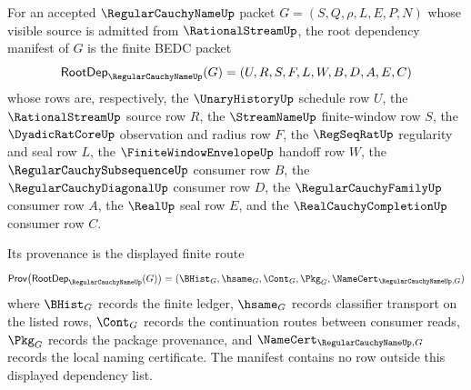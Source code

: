 \begin{definition}
\label{def:regularcauchyname-root-dependency-manifest}
For an accepted $\RegularCauchyNameUp$ packet $G=(S,Q,\rho,L,E,P,N)$ whose visible source is admitted from $\RationalStreamUp$, the root dependency manifest of $G$ is the finite BEDC packet
$$
\mathsf{RootDep}_{\RegularCauchyNameUp}(G)
=
(U,R,S,F,L,W,B,D,A,E,C)
$$
whose rows are, respectively, the $\UnaryHistoryUp$ schedule row $U$, the $\RationalStreamUp$ source row $R$, the $\StreamNameUp$ finite-window row $S$, the $\DyadicRatCoreUp$ observation and radius row $F$, the $\RegSeqRatUp$ regularity and seal row $L$, the $\FiniteWindowEnvelopeUp$ handoff row $W$, the $\RegularCauchySubsequenceUp$ consumer row $B$, the $\RegularCauchyDiagonalUp$ consumer row $D$, the $\RegularCauchyFamilyUp$ consumer row $A$, the $\RealUp$ seal row $E$, and the $\RealCauchyCompletionUp$ consumer row $C$.

Its provenance is the displayed finite route
$$
\mathsf{Prov}\bigl(\mathsf{RootDep}_{\RegularCauchyNameUp}(G)\bigr)
=
(\BHist_G,\hsame_G,\Cont_G,\Pkg_G,\NameCert_{\RegularCauchyNameUp,G})
$$
where $\BHist_G$ records the finite ledger, $\hsame_G$ records classifier transport on the listed rows, $\Cont_G$ records the continuation routes between consumer reads, $\Pkg_G$ records the package provenance, and $\NameCert_{\RegularCauchyNameUp,G}$ records the local naming certificate. The manifest contains no row outside this displayed dependency list.
\end{definition}

